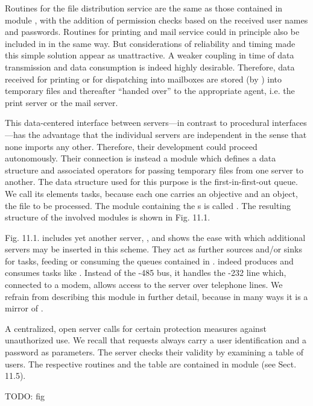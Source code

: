 Routines for the file distribution service are the same as those contained in module , with the addition of permission checks based on the received user names and passwords. Routines for printing and mail service could in principle also be included in  in the same way. But considerations of reliability and timing made this simple solution appear as unattractive. A weaker coupling in time of data transmission and data consumption is indeed highly desirable. Therefore, data received for printing or for dispatching into mailboxes are stored (by ) into temporary files and thereafter ``handed over'' to the appropriate agent, i.e. the print server or the mail server.

This data-centered interface between servers---in contrast to procedural inter\-faces---has the advantage that the individual servers are independent in the sense that none imports any other. Therefore, their development could proceed autonomously. Their connection is instead a module which defines a data structure and associated operators for passing temporary files from one server to another. The data structure used for this purpose is the first-in-first-out queue. We call its elements tasks, because each one carries an objective and an object, the file to be processed. The module containing the s is called . The resulting structure of the involved modules is shown in Fig. 11.1.

Fig. 11.1. includes yet another server, , and shows the ease with which additional servers may be inserted in this scheme. They act as further sources and/or sinks for tasks, feeding or consuming the queues contained in .  indeed produces and consumes tasks like . Instead of the -485 bus, it handles the -232 line which, connected to a modem, allows access to the server over telephone lines. We refrain from describing this module in further detail, because in many ways it is a mirror of .

A centralized, open server calls for certain protection measures against unauthorized use. We recall that requests always carry a user identification and a password as parameters. The server checks their validity by examining a table of users. The respective routines and the table are contained in module  (see Sect. 11.5).

TODO: fig


